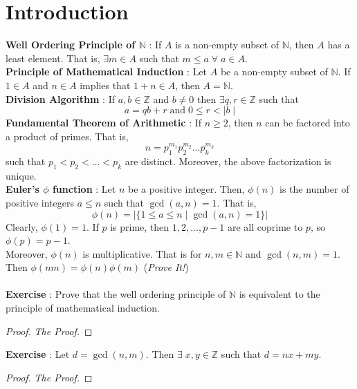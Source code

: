\documentclass{article}
\theoremstyle{definition}
\theoremstyle{remark}
\theoremstyle{definition}
\theoremstyle{definition}
\theoremstyle{definition}
\theoremstyle{proof}
\newcommand{\abs}[1]{\left \vert#1\right \vert}
\begin{document}
\section{Introduction}
\textbf{Well Ordering Principle of $ \mathbb{N} $} : If $ A $ is a non-empty subset of $ \mathbb{N} $, then $ A $ has a least element. That is, $ \exists m \in A $ such that $ m\le a \;\forall \;a\in A $. \\
\textbf{Principle of Mathematical Induction} : Let $ A $ be a non-empty subset of $ \mathbb{N} $. If $ 1\in A $ and $ n\in A $ implies that $ 1+n\in A $, then $ A = \mathbb{N} $.\\
\textbf{Division Algorithm} : If $ a,b\in \mathbb{Z} $ and $ b\neq 0 $ then $ \exists q,r\in \mathbb{Z} $ such that 
\[a = qb+r\;\text{and}\; 0\le r < |b\;|\]
\textbf{Fundamental Theorem of Arithmetic} : If $ n\ge 2 $, then $ n $ can be factored into a product of primes. That is,
\[n = p_1^{m_1}p_2^{m_2}\dots p_k^{m_k}\]
such that $ p_1<p_2<\dots<p_k $ are distinct. Moreover, the above factorization is unique.\\
\textbf{Euler's $ \phi $ function} : Let $ n $ be a positive integer. Then, $ \phi(n) $ is the number of positive integers $ a \le n$ such that $ \gcd(a,n) = 1 $. That is,
\[\phi(n) = \abs{\{1\le a\le n \;\vert\; \gcd(a,n)=1\}}\]
	Clearly, $ \phi(1) = 1 $. If $ p $ is prime, then $ 1,2,\dots, p-1 $ are all coprime to $ p $, so $ \phi(p) = p-1 $.\\
		Moreover, $ \phi(n) $ is multiplicative. That is for $ n,m\in \mathbb{N} $ and $ \gcd(n,m) = 1 $. Then $ \phi(nm) = \phi(n)\phi(m) $ (\emph{Prove It!})
\\\\
\textbf{Exercise} :
Prove that the well ordering principle of $ \mathbb{N} $ is equivalent to the principle of mathematical induction. 
\begin{proof}
	\emph{The Proof.}
\end{proof}
\textbf{Exercise} : Let $ d = \gcd(n,m) $. Then $ \exists \;x,y\in \mathbb{Z} $ such that $ d = nx + my $.
\begin{proof}
	\emph{The Proof.}
\end{proof}
\end{document}
